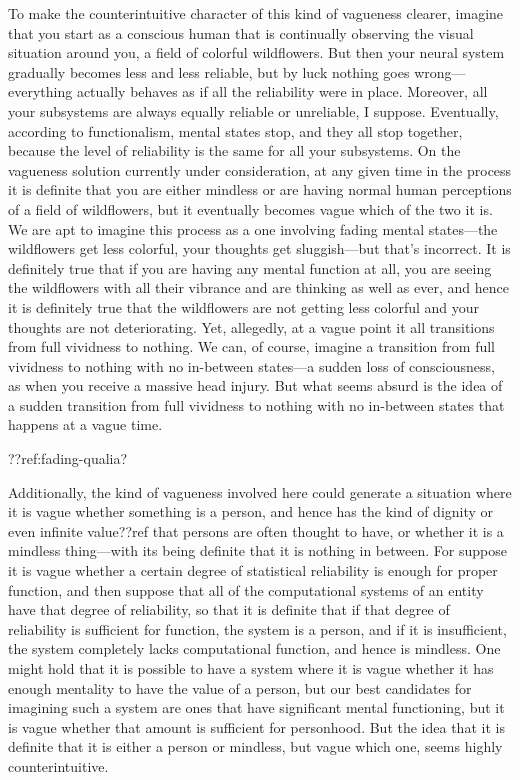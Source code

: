 To make the counterintuitive character of this kind of vagueness clearer, imagine that you start as a conscious human
that is continually observing the visual situation around you, a field of colorful wildflowers. But then your neural system gradually 
becomes less and less reliable, but by luck nothing goes wrong---everything actually behaves as if all the reliability were 
in place. Moreover, all
your subsystems are always equally reliable or unreliable, I suppose. Eventually, according to functionalism, mental states 
stop, and they all stop together, because the level of reliability is the same for all your subsystems. On the vagueness
solution currently under consideration, at any given time in the process it is definite that you are either mindless or 
are having normal human perceptions of a field of wildflowers, but it eventually becomes vague which of the two it is.
We are apt to imagine this process as a one involving fading mental states---the wildflowers get less colorful, your thoughts get 
sluggish---but that's incorrect. It is definitely true that if you are having any mental function at all, you are seeing 
the wildflowers with all their vibrance and are thinking as well as ever, and hence it is definitely true that the 
wildflowers are not getting less colorful and your thoughts are not deteriorating. Yet, allegedly, at a vague point 
it all transitions from full vividness to nothing. We can, of course, imagine a transition from full vividness to nothing
with no in-between states---a sudden loss of consciousness, as when you receive a massive head injury. But what 
seems absurd is the idea of a sudden transition from full vividness to nothing with no in-between states that 
happens at a vague time. 

??ref:fading-qualia?

Additionally, the kind of vagueness involved here could generate a situation where it is vague whether something is a 
person, and hence has the kind of dignity or even infinite value??ref that persons are often thought to have, or whether
it is a mindless thing---with its being definite that it is nothing in between. For suppose it is vague whether
a certain degree of statistical reliability is enough for proper function, and then suppose that all of the computational 
systems of an entity have that degree of reliability, so that it is definite that if that degree of reliability is sufficient
for function, the system is a person, and if it is insufficient, the system completely lacks computational function, and hence
is mindless. One might hold that it is possible to have a system where it is vague whether it has enough mentality to have 
the value of a person, but our best candidates for imagining such a system are ones that have significant mental functioning,
but it is vague whether that amount is sufficient for personhood. But the idea that it is definite that it is either a 
person or mindless, but vague which one, seems highly counterintuitive.


